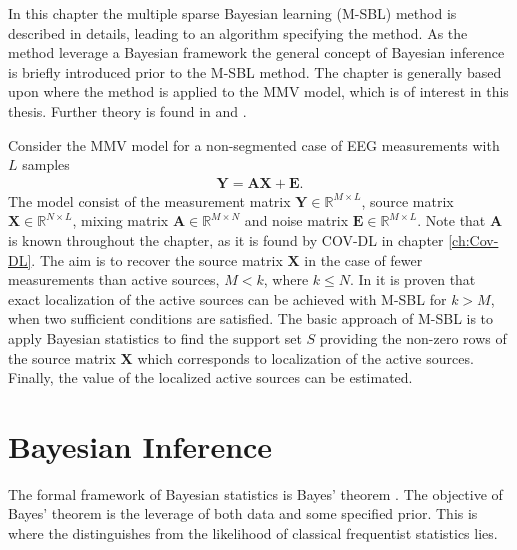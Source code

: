 In this chapter the multiple sparse Bayesian learning (M-SBL) method is described in details, leading to an algorithm specifying the method. As the method leverage a Bayesian framework the general concept of Bayesian inference is briefly introduced prior to the M-SBL method. The chapter is generally based upon \cite{Balkan2014} where the method is applied to the MMV model, which is of interest in this thesis. Further theory is found in \cite{phd_wipf} and \cite{article_wipf}.

Consider the MMV model for a non-segmented case of EEG measurements with $L$ samples
\begin{align}
\mathbf{Y} = \mathbf{AX} + \mathbf{E}.\label{eq:MSBL_MMV}
\end{align}
The model consist of the measurement matrix $\mathbf{Y} \in \mathbb{R}^{M \times L}$, source matrix $\mathbf{X} \in \mathbb{R}^{N \times L}$, mixing matrix $\mathbf{A} \in \mathbb{R}^{M \times N}$ and noise matrix $\mathbf{E} \in \mathbb{R}^{M \times L}$. Note that $\mathbf{A}$ is known throughout the chapter, as it is found by COV-DL in chapter \ref{ch:Cov-DL}.
The aim is to recover the source matrix $\mathbf{X}$ in the case of fewer measurements than active sources, $M < k$, where $k\leq N$. 
In \cite{Balkan2014} it is proven that exact localization of the active sources can be achieved with M-SBL for $k > M$, when two sufficient conditions are satisfied. 
The basic approach of M-SBL is to apply Bayesian statistics to find the support set $S$ providing the non-zero rows of the source matrix $\mathbf{X}$ which corresponds to localization of the active sources. Finally, the value of the localized active sources can be estimated.  

\section{Bayesian Inference} 
The formal framework of Bayesian statistics is Bayes' theorem \cite[p. 86]{Kay}. The objective of Bayes' theorem is the leverage of both data and some specified prior. This is where the distinguishes from the likelihood of classical frequentist statistics lies.     

